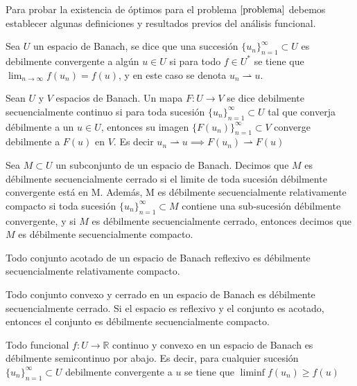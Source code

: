\documentclass{article}
\begin{document}
\noindent
Para probar la existencia de óptimos para el problema $\ref{problema}$ debemos establecer algunas definiciones y resultados previos del análisis funcional.
\theoremstyle{definition}
\begin{definition}
Sea $U$ un espacio de Banach, se dice que una succesión $\{u_n\}_{n=1}^{\infty}\subset U$ es debilmente convergente a algún $u\in U$ si para todo $f\in U^{*}$ se tiene que $\lim_{n\to \infty}f(u_n)=f(u)$, y en este caso se denota $u_n\rightharpoonup u$.
\end{definition}
\theoremstyle{definition}
\begin{definition}
Sean $U$ y $V$ espacios de Banach. Un mapa $F:U\to V$ se dice debilmente secuencialmente continuo si para toda sucesión $\{u_n\}_{n=1}^{\infty}\subset U$ tal que converja débilmente a un $u\in U$, entonces su imagen  $\{F(u_n)\}_{n=1}^{\infty}\subset V$ converge debilmente a $F(u)$ en $V$.  Es decir $u_n\rightharpoonup u \implies F(u_n)\rightharpoonup F(u)$
\end{definition}
\theoremstyle{definition}
\begin{definition}
Sea $M\subset U$ un subconjunto de un espacio de Banach. Decimos que $M$ es débilmente secuencialmente cerrado si el limite de toda sucesión débilmente convergente está en M. Además, M es débilmente secuencialmente relativamente compacto si toda sucesión $\{u_n\}_{n=1}^{\infty} \subset M$ contiene una sub-sucesión débilmente convergente, y si $M$ es débilmente secuencialmente cerrado, entonces decimos que $M$ es débilmente secuencialmente compacto.
\end{definition}

\begin{theorem}
Todo conjunto acotado de un espacio de Banach reflexivo es débilmente secuencialmente relativamente compacto.
\end{theorem}

\begin{theorem}
Todo conjunto convexo y cerrado en un espacio de Banach es débilmente secuencialmente cerrado. Si el espacio es reflexivo y el conjunto es acotado, entonces el conjunto es débilmente secuencialmente compacto.
\end{theorem}

\begin{theorem}
Todo funcional $f:U\to \mathbb{R}$ continuo y convexo en un espacio de Banach es débilmente semicontinuo por abajo. Es decir,  para cualquier sucesión $\{u_n\}_{n=1}^{\infty} \subset U$ debilmente convergente a $u$ se tiene que $\liminf f(u_n)\geq f(u)$
\end{theorem}
\end{document}
